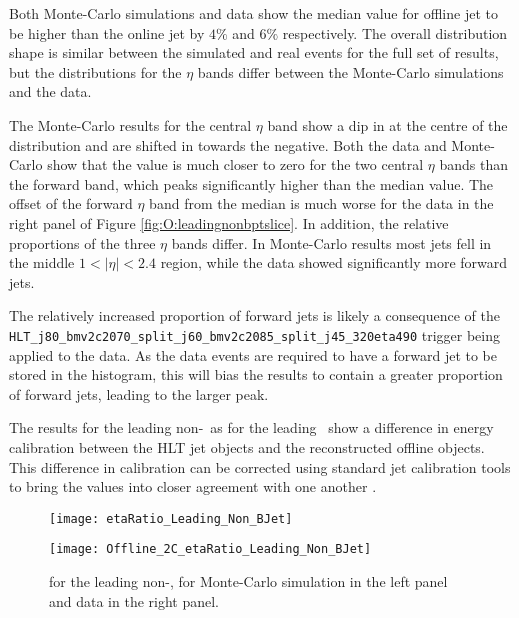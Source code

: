 	Both Monte-Carlo simulations and data show the median value for offline jet \pt to be higher than the online jet by $4\%$ and $6\%$ respectively. The overall distribution shape is similar between the simulated and real events for the full set of results, but the distributions for the $\eta$ bands differ between the Monte-Carlo simulations and the data.

	The Monte-Carlo results for the central $\eta$ band show a dip in \pt at the centre of the distribution and are shifted in \dptpt towards the negative. Both the data and Monte-Carlo show that the \dptpt value is much closer to zero for the two central $\eta$ bands than the forward band, which peaks significantly higher than the median \dptpt value. The offset of the forward $\eta$ band from the median is much worse for the data in the right panel of Figure \ref{fig:O:leadingnonbptslice}. In addition, the relative proportions of the three $\eta$ bands differ. In Monte-Carlo results most jets fell in the middle $1<|\eta|<2.4$ region, while the data showed significantly more forward jets.

	\newpage
	The relatively increased proportion of forward jets is likely a consequence of the \texttt{HLT\_j80\_\-bmv2c2070\_split\_\-j60\_bmv2c2085\_split\_j45\_320eta490} trigger being applied to the data. As the data events are required to have a forward jet to be stored in the histogram, this will bias the results to contain a greater proportion of forward jets, leading to the larger peak.

	The \dptpt results for the leading non-\bjet\, as for the leading \bjet\, show a difference in energy calibration between the HLT jet objects and the reconstructed offline objects. This difference in calibration can be corrected using standard jet calibration tools to bring the \pt values into closer agreement with one another \cite{JES, jetcalib}.

	\begin{figure}[h]
		\centering
		\begin{minipage}[h]{0.47\linewidth}
			\texttt{[image: etaRatio\_Leading\_Non\_BJet]}

		\end{minipage}
		\begin{minipage}[h]{0.47\linewidth}
			\texttt{[image: Offline\_2C\_etaRatio\_Leading\_Non\_BJet]}
		\end{minipage}
		\caption[\dee for the leading non-\bjet\ in data and Monte-Carlo simulations]{\dee for the leading non-\bjet, for Monte-Carlo simulation in the left panel and data in the right panel.}
		\label{fig:O:leadingnonbeta}
	\end{figure}

